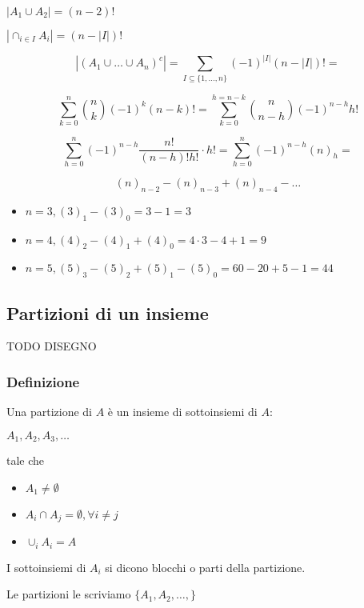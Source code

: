 \documentclass[11pt]{article}
\begin{document}
		$|A_1 \cup A_2| = (n-2)!$

		$|\cap_{i \in I} A_i| = (n-|I|)!$
		
	\[
		|(A_1 \cup \ldots \cup A_n)^{c}| = 
		\sum_{I \subseteq \{1,\ldots,n\}} (-1)^{|I|}(n-|I|)! =
	\]

	\[
		\sum_{k=0}^{n}\binom{n}{k}(-1)^{k}(n-k)! = 
		\sum_{k=0}^{h=n-k}\binom{n}{n-h}(-1)^{n-h}h!
	\]

	\[
		\sum_{h=0}^{n}(-1)^{n-h} \frac{n!}{(n-h)!h!} \cdot h! =
		\sum_{h=0}^{n}(-1)^{n-h}(n)_h =
	\]

	\[
		(n)_{n-2} - (n)_{n-3} + (n)_{n-4} - \ldots	
	\]
		\begin{itemize}
			\item $n=3 , (3)_1 - (3)_0 = 3 - 1 = 3$
			\item $n=4, (4)_2 - (4)_1 + (4)_0 = 4 \cdot 3 - 4 + 1 = 9$
			\item $n=5, (5)_3 - (5)_2 + (5)_1 - (5)_0 = 60 - 20 + 5 - 1 = 44$
		\end{itemize}
		
		\subsection{Partizioni di un insieme}

		TODO DISEGNO

		\subsubsection{Definizione}

		Una partizione di $A$ \`e un insieme di sottoinsiemi di $A$:

		$A_1,A_2,A_3,\ldots$

		tale che 

		\begin{itemize}
			\item $A_1 \neq \emptyset$
			\item $A_i \cap A_j = \emptyset, \forall i \neq j$
			\item $\cup_i A_i = A$
		\end{itemize}

		I sottoinsiemi di $A_i$ si dicono blocchi o parti della partizione.

		Le partizioni le scriviamo $\{A_1,A_2,\ldots,\}$
\end{document}
